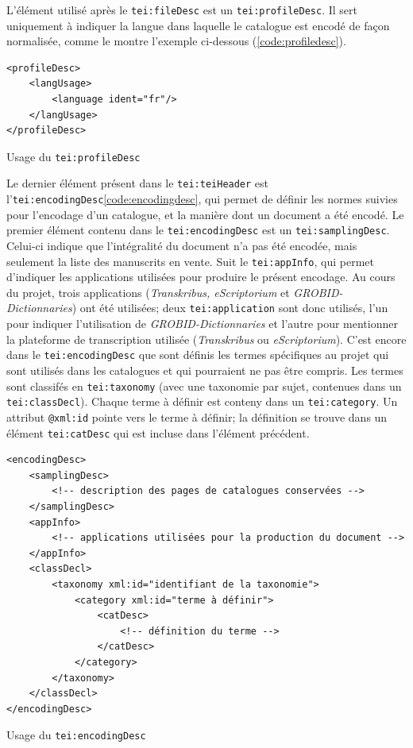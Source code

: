 L'élément utilisé après le \texttt{tei:fileDesc} est un \texttt{tei:profileDesc}. Il sert uniquement à indiquer la langue dans laquelle le catalogue est encodé de façon normalisée, comme le montre l'exemple ci-dessous (\ref{code:profiledesc}).

\begin{listing}[h]
	\begin{verbatim}
<profileDesc>
	<langUsage>
		<language ident="fr"/>
	</langUsage>
</profileDesc>
	\end{verbatim}
	\caption{Usage du \texttt{tei:profileDesc}}
	\label{code:profiledesc}
\end{listing}

Le dernier élément présent dans le \texttt{tei:teiHeader} est l'\texttt{tei:encodingDesc}\ref{code:encodingdesc}, qui permet de définir les normes suivies pour l'encodage d'un catalogue, et la manière dont un document a été encodé. Le premier élément contenu dans le \texttt{tei:encodingDesc} est un \texttt{tei:samplingDesc}. Celui-ci indique que l'intégralité du document n'a pas été encodée, mais seulement la liste des manuscrits en vente. Suit le \texttt{tei:appInfo}, qui permet d'indiquer les applications utilisées pour produire le présent encodage. Au cours du projet, trois applications (\textit{Transkribus, eScriptorium} et \textit{GROBID-Dictionnaries}) ont été utilisées; deux \texttt{tei:application} sont donc utilisés, l'un pour indiquer l'utilisation de \textit{GROBID-Dictionnaries} et l'autre pour mentionner la plateforme de transcription utilisée (\textit{Transkribus} ou \textit{eScriptorium}). C'est encore dans le \texttt{tei:encodingDesc} que sont définis les termes spécifiques au projet qui sont utilisés dans les catalogues et qui pourraient ne pas être compris. Les termes sont classifés en \texttt{tei:taxonomy} (avec une taxonomie par sujet, contenues dans un \texttt{tei:classDecl}). Chaque terme à définir est conteny dans un \texttt{tei:category}. Un attribut \texttt{@xml:id} pointe vers le terme à définir; la définition se trouve dans un élément \texttt{tei:catDesc} qui est incluse dans l'élément précédent.

\begin{listing}[h]
	\begin{verbatim}
<encodingDesc>
	<samplingDesc>
		<!-- description des pages de catalogues conservées -->
	</samplingDesc>
	<appInfo>
		<!-- applications utilisées pour la production du document -->
	</appInfo>
	<classDecl>
		<taxonomy xml:id="identifiant de la taxonomie">
			<category xml:id="terme à définir">
				<catDesc>
					<!-- définition du terme -->
				</catDesc>
			</category>
		</taxonomy>
	</classDecl>
</encodingDesc>
	\end{verbatim}
	\caption{Usage du \texttt{tei:encodingDesc}}
	\label{code:encodingdesc}
\end{listing}

